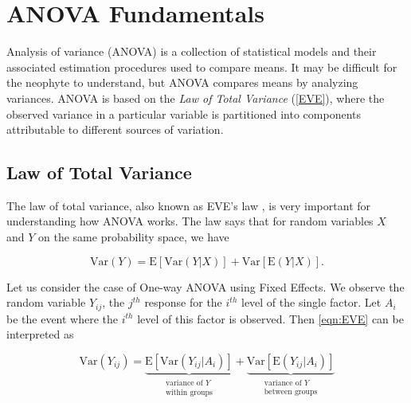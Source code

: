 \documentclass[
]{book}
\newenvironment{Shaded}{\begin{snugshade}}{\end{snugshade}}
\newcommand{\AttributeTok}[1]{\textcolor[rgb]{0.77,0.63,0.00}{#1}}
\newcommand{\ConstantTok}[1]{\textcolor[rgb]{0.00,0.00,0.00}{#1}}
\newcommand{\DecValTok}[1]{\textcolor[rgb]{0.00,0.00,0.81}{#1}}
\newcommand{\FunctionTok}[1]{\textcolor[rgb]{0.00,0.00,0.00}{#1}}
\newcommand{\NormalTok}[1]{#1}
\newcommand{\SpecialCharTok}[1]{\textcolor[rgb]{0.00,0.00,0.00}{#1}}
\newcommand{\E}{\mathrm{E}}
\newcommand{\Var}{\mathrm{Var}}
\begin{document}
\hypertarget{anova-fun}{%
\chapter{ANOVA Fundamentals}\label{anova-fun}}

\begin{Shaded}
\end{Shaded}

Analysis of variance (ANOVA) is a collection of statistical models and their associated estimation procedures used to compare means. It may be difficult for the neophyte to understand, but ANOVA compares means by analyzing variances. ANOVA is based on the \emph{Law of Total Variance} (\ref{EVE}), where the observed variance in a particular variable is partitioned into components attributable to different sources of variation.\autocite{ANOVA}

\hypertarget{law-of-total-variance}{%
\section{\texorpdfstring{Law of Total Variance \label{EVE}}{Law of Total Variance }}\label{law-of-total-variance}}

The law of total variance, also known as EVE's law \autocite{EVE}\autocite{EVE-intuition}, is very important for understanding how ANOVA works. The law says that for random variables \(X\) and \(Y\) on the same probability space, we have

\begin{equation}
\label{eqn:EVE}
\Var(Y) = \E[\Var(Y|X)] + \Var[\E(Y|X)].
\end{equation}

Let us consider the case of One-way ANOVA using Fixed Effects. We observe the random variable \(Y_{ij}\), the \(j^{th}\) response for the \(i^{th}\) level of the single factor. Let \(A_i\) be the event where the \(i^{th}\) level of this factor is observed. Then \ref{eqn:EVE} can be interpreted as

\begin{equation}
\label{eqn:EVE2}
\Var(Y_{ij}) = \underbrace{\E[\Var(Y_{ij}|A_i)]}_{\substack{\text{variance of } Y \\ \text{within groups}}} + \underbrace{\Var[\E(Y_{ij}|A_i)]}_{\substack{\text{variance of } Y \\ \text{between groups}}}
\end{equation}
\end{document}
